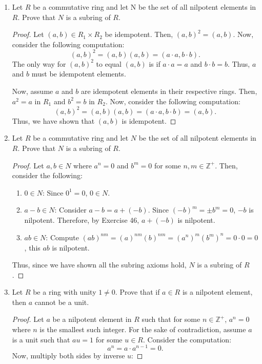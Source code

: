 \documentclass[12pt, oneside]{book}
\newcommand{\Z}{\mathbb{Z}}
\newcommand{\pf}[1]{
    \begin{customframedproof}[linecolor=orangehdx!75]
        \begin{proof}
        #1
        \end{proof}
    \end{customframedproof}
}
\begin{document}
\begin{enumerate}
    \item Let \(R\) be a commutative ring and let N be the set of all nilpotent elements in \(R\). Prove that \(N\) is a subring of \(R\).
    \pf{
        Let \((a,b) \in R_{1} \times R_{2}\) be idempotent. Then, \((a,b)^{2} = (a,b)\). Now, consider the following computation:
        \[
            (a,b)^{2} = (a,b)(a,b) = (a \cdot a, b \cdot b).
        \]
        The only way for \((a,b)^{2}\) to equal \((a,b)\) is if \(a \cdot a = a\) and \(b \cdot b = b\). Thus, \(a\) and \(b\) must be idempotent elements. 
        
        Now, assume \(a\) and \(b\) are idempotent elements in their respective rings. Then, \(a^{2} = a\) in \(R_{1}\) and \(b^{2} = b\) in \(R_{2}\). Now, consider the following computation:
        \[
            (a,b)^{2} = (a,b)(a,b) = (a \cdot a, b \cdot b) = (a, b).
        \]
        Thus, we have shown that \((a,b)\) is idempotent.
    }
    \item Let \(R\) be a commutative ring and let \(N\) be the set of all nilpotent elements in \(R\). Prove that \(N\) is a subring of \(R\).
    \pf{
        Let \(a,b \in N\) where \(a^{n} = 0\) and \(b^{m} = 0\) for some \(n,m \in \Z^{+}\). Then, consider the following:
        \begin{enumerate}
            \item \(0 \in N\): Since \(0^{1} = 0 \), \(0 \in N\).  
            \item \(a - b \in N\): Consider \(a - b = a + (-b)\). Since \((-b)^{m} = \pm b^{m} = 0\), \(-b\) is nilpotent. Therefore, by Exercise 46, \(a + (-b)\) is nilpotent. 
            \item \(ab \in N\): Compute \((ab)^{nm} = (a)^{nm}(b)^{nm} = (a^{n})^{m}(b^{m})^{n} = 0 \cdot 0 = 0\), this \(ab\) is nilpotent. 
        \end{enumerate}
        Thus, since we have shown all the subring axioms hold, \(N\) is a subring of \(R\).
    }
    \item Let \(R\) be a ring with unity \(1 \ne 0\). Prove that if \(a \in R\) is a nilpotent element, then \(a\) cannot be a unit. 
    \pf{
        Let \(a\) be a nilpotent element in \(R\) such that for some \(n \in \Z^{+}\), \(a^{n} = 0\) where \(n\) is the smallest such integer. For the sake of contradiction, assume \(a\) is a unit such that \(au = 1\) for some \(u \in R\). Consider the computation:
        \[
            a^{n} = a \cdot a^{n - 1} = 0.
        \]
        Now, multiply both sides by inverse \(u\):
}
\end{enumerate}
\end{document}
